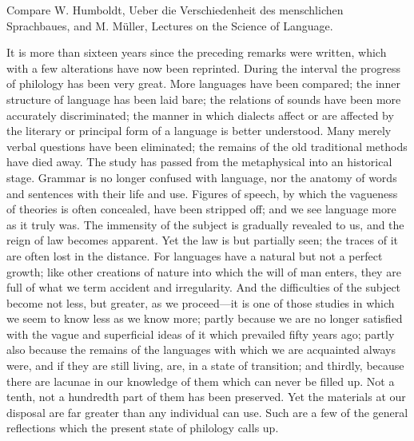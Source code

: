 \documentclass[11pt,letter]{article}
\begin{document}
\par  [1] Compare W. Humboldt, Ueber die Verschiedenheit des menschlichen Sprachbaues, and M. Müller, Lectures on the Science of Language.

\par  It is more than sixteen years since the preceding remarks were written, which with a few alterations have now been reprinted. During the interval the progress of philology has been very great. More languages have been compared; the inner structure of language has been laid bare; the relations of sounds have been more accurately discriminated; the manner in which dialects affect or are affected by the literary or principal form of a language is better understood. Many merely verbal questions have been eliminated; the remains of the old traditional methods have died away. The study has passed from the metaphysical into an historical stage. Grammar is no longer confused with language, nor the anatomy of words and sentences with their life and use. Figures of speech, by which the vagueness of theories is often concealed, have been stripped off; and we see language more as it truly was. The immensity of the subject is gradually revealed to us, and the reign of law becomes apparent. Yet the law is but partially seen; the traces of it are often lost in the distance. For languages have a natural but not a perfect growth; like other creations of nature into which the will of man enters, they are full of what we term accident and irregularity. And the difficulties of the subject become not less, but greater, as we proceed—it is one of those studies in which we seem to know less as we know more; partly because we are no longer satisfied with the vague and superficial ideas of it which prevailed fifty years ago; partly also because the remains of the languages with which we are acquainted always were, and if they are still living, are, in a state of transition; and thirdly, because there are lacunae in our knowledge of them which can never be filled up. Not a tenth, not a hundredth part of them has been preserved. Yet the materials at our disposal are far greater than any individual can use. Such are a few of the general reflections which the present state of philology calls up.
\end{document}

